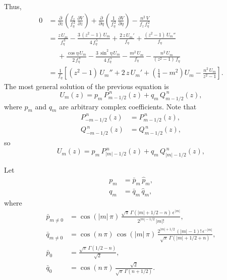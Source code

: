 \documentclass[12pt,prb,aps,notitlepage]{revtex4-1}
\begin{document}
Thus,
\begin{align}
0&=\frac{\partial}{\partial z}\!\left(\frac{f_z}{f_\eta^{\,2}}\,\frac{\partial V}{\partial z}\right)+ \frac{\partial}{\partial \eta}\!\left(\frac{1}{f_\eta^{\,2}}\,\frac{\partial V}{\partial \eta}\right)
-\frac{n^2\,V}{f_z\,f_\eta^{\,2}}\nonumber\\[0.5ex]&
= \frac{z\,U_m}{f_\eta^{\,3}} -\frac{3\,(z^2-1)\,U_m}{4\,f_\eta^{\,5}}
+\frac{2\,z\,U_m'}{f_\eta}
+\frac{(z^2-1)\,U_m''}{f_\eta}\nonumber\\[0.5ex]
&\phantom{=}+\frac{\cos\eta\,U_m}{2\,f_\eta^{\,3}}- \frac{3\,\sin^2\eta\,U_m}{4\,f_\eta^{\,5}} - \frac{m^2\,U_m}{f_\eta} -\frac{n^2\,U_m}{(z^2-1)\,f_\eta}\nonumber\\[0.5ex]
&=\frac{1}{f_\eta}\left[(z^2-1)\,U_m'' + 2\,z\,U_m' + \left(\frac{1}{4}-m^2\right)U_m - \frac{n^2\,U_m}{z^2-1}\right].
\end{align}
The most general solution of the previous equation is
\begin{equation}
U_m(z) = p_m\,P_{m-1/2}^{\,n}(z)+q_m\,Q_{m-1/2}^{\,n}(z),
\end{equation}
where $p_m$ and $q_m$ are arbitrary complex coefficients. 
Note that
\begin{align}
P_{-m-1/2}^{\,n}(z) &= P_{m-1/2}^{\,n}(z),\\[0.5ex]
Q_{-m-1/2}^{\,n}(z) &= Q_{m-1/2}^{\,n}(z),
\end{align}
so 
\begin{equation}
U_m(z) = p_m\,P_{|m|-1/2}^{\,n}(z)+q_m\,Q_{|m|-1/2}^{\,n}(z),
\end{equation}

Let
\begin{align}
p_m&= \bar{p}_m\,\hat{p}_m,\\[0.5ex]
q_m &= \bar{q}_m\,\hat{q}_m,
\end{align}
where
\begin{align}
\bar{p}_{m\neq 0}&= \cos(|m|\,\pi)\,\frac{\sqrt{\pi}\,\Gamma(|m|+1/2-n)\,\epsilon^{\,|m|}}{2^{|m|-1/2}\,|m|!},\\[0.5ex]
\bar{q}_{m\neq 0} &= \cos(n\,\pi)\,\cos(|m|\,\pi)\,\frac{2^{|m|+1/2}\,(|m|-1)!\,\epsilon^{-|m|}}{\sqrt{\pi}\,\Gamma(|m|+1/2+n)},\\[0.5ex]
\bar{p}_0&= \frac{\sqrt{\pi}\,\Gamma(1/2-n)}{\sqrt{2}},\\[0.5ex]
\bar{q}_0&= \cos(n\,\pi)\,\frac{\sqrt{2}}{\sqrt{\pi}\,\Gamma(n+1/2)}.
\end{align}
\end{document}
